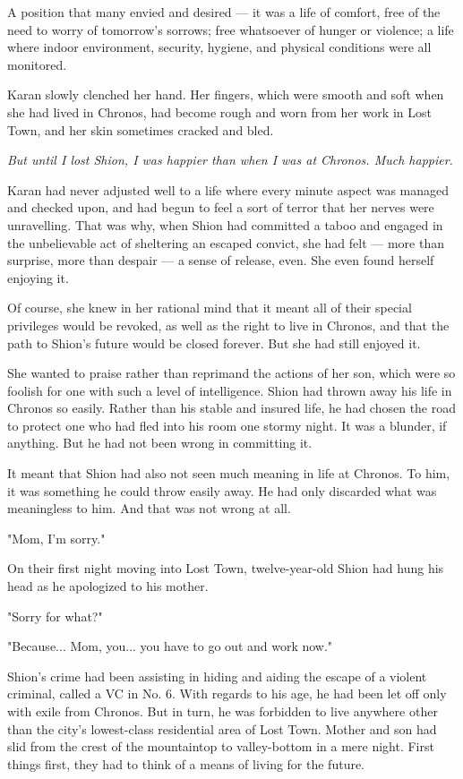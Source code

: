 A position that many envied and desired --- it was a life of comfort, free
of the need to worry of tomorrow's sorrows; free whatsoever of hunger or
violence; a life where indoor environment, security, hygiene, and
physical conditions were all monitored.

Karan slowly clenched her hand. Her fingers, which were smooth and soft
when she had lived in Chronos, had become rough and worn from her work
in Lost Town, and her skin sometimes cracked and bled.

\emph{But until I lost Shion, I was happier than when I was at Chronos. Much
happier.}

Karan had never adjusted well to a life where every minute aspect was
managed and checked upon, and had begun to feel a sort of terror that
her nerves were unravelling. That was why, when Shion had committed a
taboo and engaged in the unbelievable act of sheltering an escaped
convict, she had felt --- more than surprise, more than despair --- a sense
of release, even. She even found herself enjoying it.

Of course, she knew in her rational mind that it meant all of their
special privileges would be revoked, as well as the right to live in
Chronos, and that the path to Shion's future would be closed forever.
But she had still enjoyed it.

She wanted to praise rather than reprimand the actions of her son, which
were so foolish for one with such a level of intelligence. Shion had
thrown away his life in Chronos so easily. Rather than his stable and
insured life, he had chosen the road to protect one who had fled into
his room one stormy night. It was a blunder, if anything. But he had not
been wrong in committing it.

It meant that Shion had also not seen much meaning in life at Chronos.
To him, it was something he could throw easily away. He had only
discarded what was meaningless to him. And that was not wrong at all.

"Mom, I'm sorry."

On their first night moving into Lost Town, twelve-year-old Shion had
hung his head as he apologized to his mother.

"Sorry for what?"

"Because... Mom, you... you have to go out and work now."

Shion's crime had been assisting in hiding and aiding the escape of a
violent criminal, called a VC in No. 6. With regards to his age, he had
been let off only with exile from Chronos. But in turn, he was forbidden
to live anywhere other than the city's lowest-class residential area of
Lost Town. Mother and son had slid from the crest of the mountaintop to
valley-bottom in a mere night. First things first, they had to think of
a means of living for the future.

